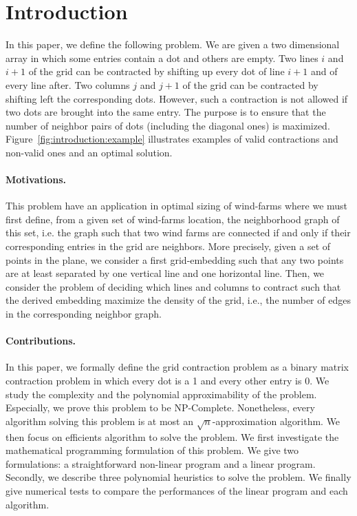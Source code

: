 \section{Introduction}
\label{sect:intro}


In this paper, we define the following problem. We are given a two dimensional array in which some entries contain a dot and others are empty. Two lines $i$ and $i+1$ of the grid can be contracted by shifting up every dot of line $i+1$ and of every line after. Two columns $j$ and $j+1$ of the grid can be contracted by shifting left the corresponding dots. However, such a contraction is not allowed if two dots are brought into the same entry. The purpose is to ensure that the number of neighbor pairs of dots (including the diagonal ones) is maximized. Figure~\ref{fig:introduction:example} illustrates examples of valid contractions and non-valid ones and an optimal solution.




\paragraph{Motivations. }
This problem have an application in optimal sizing of wind-farms \cite{Pillai2015} where we must first define, from a given set of wind-farms location, the neighborhood graph of this set, i.e. the graph such that two wind farms are connected if and only if their corresponding entries in the grid are neighbors. More precisely, given a set of points in the plane, we consider a first grid-embedding such that any two points are at least separated by one vertical line and one horizontal line. Then, we consider the problem of deciding which lines and columns to contract such that the derived embedding maximize the density of the grid, i.e., the number of edges in the corresponding neighbor graph.
\vspace{-0.2cm}
\paragraph{Contributions. } In this paper, we formally define the grid contraction problem as a binary matrix contraction problem in which every dot is a 1 and every other entry is 0. We study the complexity and the polynomial approximability of the problem. Especially, we prove this problem to be NP-Complete. Nonetheless, every algorithm solving this problem is at most an $\sqrt{n}$-approximation algorithm. We then focus on efficients algorithm to solve the problem. We first investigate the mathematical programming formulation of this problem. We give two formulations: a straightforward non-linear program and a linear program.
Secondly, we describe three polynomial heuristics to solve the problem. We finally give numerical tests to compare the performances of the linear program and each algorithm. 

